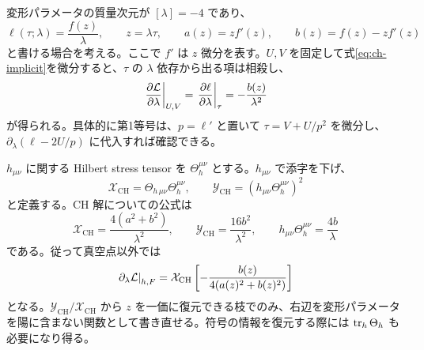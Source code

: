 変形パラメータの質量次元が $[\lambda]=-4$ であり、
\begin{equation}
 \ell(\tau;\lambda)=\frac{f(z)}{\lambda},\qquad z=\lambda\tau,
 \qquad a(z)=zf'(z),\qquad b(z)=f(z)-zf'(z)
 \label{eq:ch-one-scale}
\end{equation}
と書ける場合を考える。ここで $f'$ は $z$ 微分を表す。$U,V$ を固定して式\eqref{eq:ch-implicit}を微分すると、$\tau$ の $\lambda$ 依存から出る項は相殺し、
\begin{equation}
 \left.\frac{\partial\mathcal L}{\partial\lambda}\right|_{U,V}
 =\left.\frac{\partial\ell}{\partial\lambda}\right|_\tau
 =-\frac{b(z)}{\lambda^2}
 \label{eq:ch-one-scale-derivative}
\end{equation}
が得られる。具体的に第1等号は、$p=\ell'$ と置いて $\tau=V+U/p^2$ を微分し、$\partial_\lambda(\ell-2U/p)$ に代入すれば確認できる。

$h_{\mu\nu}$ に関する Hilbert stress tensor を $\Theta_h^{\mu\nu}$ とする。$h_{\mu\nu}$ で添字を下げ、
\begin{equation}
 \mathcal X_{\mathrm{CH}}=\Theta_{h\,\mu\nu}\Theta_h^{\mu\nu},
 \qquad
 \mathcal Y_{\mathrm{CH}}=(h_{\mu\nu}\Theta_h^{\mu\nu})^2
 \label{eq:ch-invariants}
\end{equation}
と定義する。CH 解についての公式\cite{Pezhman2026}は
\begin{equation}
 \mathcal X_{\mathrm{CH}}=\frac{4(a^2+b^2)}{\lambda^2},
 \qquad \mathcal Y_{\mathrm{CH}}=\frac{16b^2}{\lambda^2},
 \qquad h_{\mu\nu}\Theta_h^{\mu\nu}=\frac{4b}{\lambda}
 \label{eq:ch-invariants-ab}
\end{equation}
である。従って真空点以外では
\begin{equation}
 \left.\partial_\lambda\mathcal L\right|_{h,F}
 =\mathcal X_{\mathrm{CH}}
 \left[-\frac{b(z)}{4(a(z)^2+b(z)^2)}\right]
 \label{eq:ch-general-flow}
\end{equation}
となる。$\mathcal Y_{\mathrm{CH}}/\mathcal X_{\mathrm{CH}}$ から $z$ を一価に復元できる枝でのみ、右辺を変形パラメータを陽に含まない関数として書き直せる。符号の情報を復元する際には $\operatorname{tr}_h\Theta_h$ も必要になり得る。


